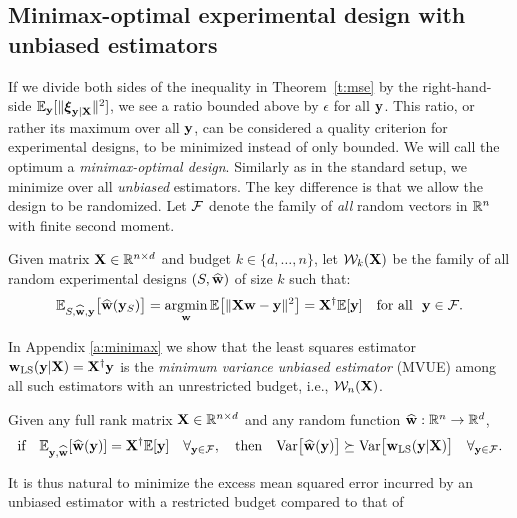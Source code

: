 \documentclass[12pt]{sty/colt2019/colt2018-arxiv}
\begin{document}
\subsection{Minimax-optimal experimental design with unbiased estimators}
\label{s:minimax}
If we divide both sides of the inequality in Theorem~\ref{t:mse} by
the right-hand-side $\mathbb E_\mathbf y[\|\boldsymbol\xi_{\mathbf y|\mathbf X}\|^2]$, we see a ratio bounded above by $\epsilon$
for all $\mathbf y$. This ratio, or rather its maximum over all $\mathbf y$, can be considered a
quality criterion for experimental designs,  to be minimized instead of only
bounded. We will call the optimum a
\emph{minimax-optimal design}. Similarly as in the standard setup, we
minimize over all \emph{unbiased} estimators.
The key difference
is that we allow the design to be randomized.
Let $\mathcal{F}$ denote the family
of \textit{all} random vectors in $\mathbb R^n$ with finite second moment.
\begin{definition}
Given matrix $\mathbf X\in\mathbb R^{n\times d}$ and budget $k\in\{d,\dots,n\}$, let
$\mathcal{W}_k(\mathbf X)$ be the family of all random experimental designs $(S,\widehat{\mathbf w})$ of
size $k$ such that: %
\begin{align*}
\mathbb E_{S,\widehat{\mathbf w},\mathbf y}\big[\widehat{\mathbf w}(\mathbf y_S)\big]
    = \operatorname*{\mathop{\mathrm{argmin}}}_\mathbf w\mathbb E\big[\|\mathbf X\mathbf w-\mathbf y\|^2\big]
    = \mathbf X^\dagger\mathbb E[\mathbf y]\quad\text{for
  all }\ \mathbf y\in\mathcal{F}.
\end{align*}
\end{definition}
In Appendix \ref{a:minimax} we show that the least squares estimator
$\mathbf w_{\mathrm{LS}}(\mathbf y|\mathbf X)=\mathbf X^\dagger\mathbf y$ is 
the \textit{minimum variance unbiased estimator} (MVUE) among all
such estimators with an unrestricted budget, i.e., $\mathcal{W}_n(\mathbf X)$. 
\begin{proposition}\label{p:mvue}
Given any full rank matrix $\mathbf X\in\mathbb R^{n\times d}$ and any random function
$\widehat{\mathbf w}:\mathbb R^n\rightarrow\mathbb R^d$,
\begin{align*}
\text{if}\quad
  \mathbb E_{\mathbf y,\widehat{\mathbf w}}[\widehat{\mathbf w}(\mathbf y)]=\mathbf X^\dagger\mathbb E[\mathbf y]\quad \forall_{\mathbf y\in\mathcal{F}},
  \quad\text{then}\quad
  \mathrm{Var}\big[\widehat{\mathbf w}(\mathbf y)\big]\succeq\mathrm{Var}\big[\mathbf w_{\mathrm{LS}}(\mathbf y|\mathbf X)\big]\quad \forall_{\mathbf y\in\mathcal{F}}.
\end{align*}
\end{proposition}
It is thus natural to minimize the excess mean squared error incurred by an
unbiased estimator with a restricted budget compared to that of
\end{document}
